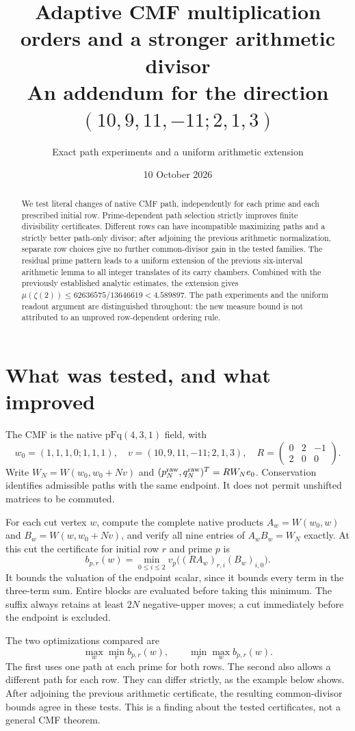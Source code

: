 \documentclass[11pt]{article}
\title{Adaptive CMF multiplication orders and a stronger arithmetic divisor\\
\large An addendum for the direction $(10,9,11,-11;2,1,3)$}
\author{Exact path experiments and a uniform arithmetic extension}
\date{10 October 2026}
\begin{document}
\maketitle

\begin{abstract}
We test literal changes of native CMF path, independently for each prime
and each prescribed initial row. Prime-dependent path selection strictly
improves finite divisibility certificates. Different rows can have
incompatible maximizing paths and a strictly better path-only divisor;
after adjoining the previous arithmetic normalization, separate row
choices give no further common-divisor gain in the tested families.
The residual prime pattern leads to a uniform extension of the previous
six-interval arithmetic lemma to all integer translates of its carry
chambers. Combined with the previously established analytic estimates,
the extension gives
$\mu(\zeta(2))\le62636575/13646619<4.589897$.
The path experiments and the uniform readout argument are distinguished
throughout: the new measure bound is not attributed to an unproved
row-dependent ordering rule.
\end{abstract}

\section{What was tested, and what improved}
The CMF is the native $\mathrm{pFq}(4,3,1)$ field, with
\[
w_0=(1,1,1,0;1,1,1),\quad v=(10,9,11,-11;2,1,3),\quad
R=\begin{pmatrix}0&2&-1\\2&0&0\end{pmatrix}.
\]
Write $W_N=W(w_0,w_0+Nv)$ and
$(p_N^{\rm raw},q_N^{\rm raw})^T=RW_Ne_0$.
Conservation identifies admissible paths with the same endpoint.
It does not permit unshifted matrices to be commuted.

For each cut vertex $w$, compute the complete native products
$A_w=W(w_0,w)$ and $B_w=W(w,w_0+Nv)$, and verify all nine entries
of $A_wB_w=W_N$ exactly. At this cut the certificate for initial row
$r$ and prime $p$ is
\[
b_{p,r}(w)=\min_{0\le i\le2}
 v_p\bigl((RA_w)_{r,i}(B_w)_{i,0}\bigr).
\]
It bounds the valuation of the endpoint scalar, since it bounds every
term in the three-term sum. Entire blocks are evaluated before taking
this minimum. The suffix always retains at least $2N$ negative-upper
moves; a cut immediately before the endpoint is excluded.

The two optimizations compared are
\[
 \max_w\min_r b_{p,r}(w),\qquad
 \min_r\max_w b_{p,r}(w).
\]
The first uses one path at each prime for both rows. The second also
allows a different path for each row. They can differ strictly, as the
example below shows. After adjoining the previous arithmetic certificate,
the resulting common-divisor bounds agree in these tests. This is a
finding about the tested certificates, not a general CMF theorem.
\end{document}
